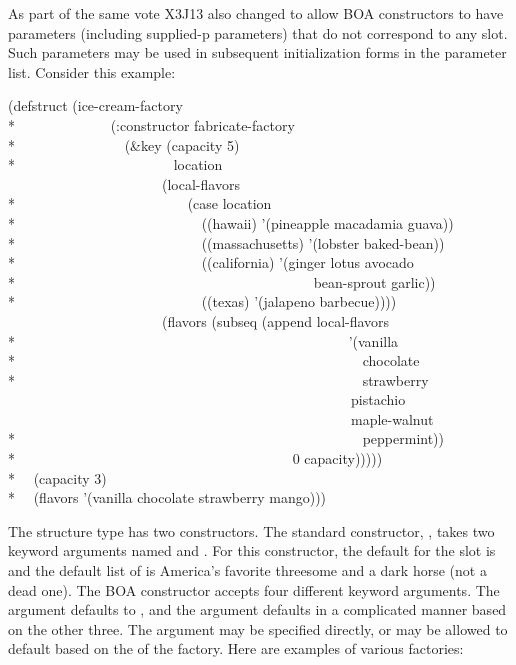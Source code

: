\begin{new}
As part of the same vote X3J13 also changed 
to allow BOA constructors to have
parameters (including supplied-p parameters)
that do not correspond to any
slot.  Such parameters may be used in subsequent initialization forms in the
parameter list. Consider this example:
\begin{lisp}
(defstruct (ice-cream-factory \\*
~~~~~~~~~~~~~(:constructor fabricate-factory \\*
~~~~~~~~~~~~~~~(\&key (capacity 5) \\*
~~~~~~~~~~~~~~~~~~~~~~location \\
~~~~~~~~~~~~~~~~~~~~~~(local-flavors \\*
~~~~~~~~~~~~~~~~~~~~~~~~(case location \\*
~~~~~~~~~~~~~~~~~~~~~~~~~~((hawaii) '(pineapple macadamia guava)) \\*
~~~~~~~~~~~~~~~~~~~~~~~~~~((massachusetts) '(lobster baked-bean)) \\*
~~~~~~~~~~~~~~~~~~~~~~~~~~((california) '(ginger lotus avocado \\*
~~~~~~~~~~~~~~~~~~~~~~~~~~~~~~~~~~~~~~~~~~bean-sprout garlic)) \\*
~~~~~~~~~~~~~~~~~~~~~~~~~~((texas) '(jalapeno barbecue)))) \\
~~~~~~~~~~~~~~~~~~~~~~(flavors (subseq (append local-flavors \\*
~~~~~~~~~~~~~~~~~~~~~~~~~~~~~~~~~~~~~~~~~~~~~~~'(vanilla \\*
~~~~~~~~~~~~~~~~~~~~~~~~~~~~~~~~~~~~~~~~~~~~~~~~~chocolate \\*
~~~~~~~~~~~~~~~~~~~~~~~~~~~~~~~~~~~~~~~~~~~~~~~~~strawberry \\
~~~~~~~~~~~~~~~~~~~~~~~~~~~~~~~~~~~~~~~~~~~~~~~~~pistachio \\
~~~~~~~~~~~~~~~~~~~~~~~~~~~~~~~~~~~~~~~~~~~~~~~~~maple-walnut \\*
~~~~~~~~~~~~~~~~~~~~~~~~~~~~~~~~~~~~~~~~~~~~~~~~~peppermint)) \\*
~~~~~~~~~~~~~~~~~~~~~~~~~~~~~~~~~~~~~~~0 capacity))))) \\*
~~(capacity 3) \\*
~~(flavors '(vanilla chocolate strawberry mango)))
\end{lisp}

The structure type  has two constructors.
The standard constructor, ,
takes two keyword arguments named  and .
For this constructor, the default for the  slot is 
and the default list of  is America's favorite threesome
and a dark horse (not a dead one).
The BOA constructor 
accepts four different keyword arguments.  The 
argument defaults to , and the  argument
defaults in a complicated manner based on the other three.
The  argument may be specified directly,
or may be allowed to default based on the  of the factory.
Here are examples of various factories:


\end{new}
